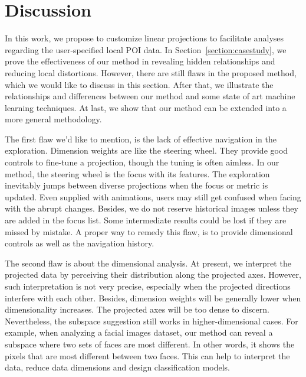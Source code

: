 \section{Discussion}
\label{section:discussion}
In this work, we propose to customize linear projections to facilitate analyses regarding the user-specified local POI data. In Section~\ref{section:casestudy}, we prove the effectiveness of our method in revealing hidden relationships and reducing local distortions. However, there are still flaws in the proposed method, which we would like to discuss in this section. After that, we illustrate the relationships and differences between our method and some state of art machine learning techniques. At last, we show that our method can be extended into a more general methodology.

The first flaw we'd like to mention, is the lack of effective navigation in the exploration. Dimension weights are like the steering wheel. They provide good controls to fine-tune a projection, though the tuning is often aimless. In our method, the steering wheel is the focus with its features. The exploration inevitably jumps between diverse projections when the focus or metric is updated. Even supplied with animations, users may still get confused when facing with the abrupt changes. Besides, we do not reserve historical images unless they are added in the focus list. Some intermediate results could be lost if they are missed by mistake. A proper way to remedy this flaw, is to provide dimensional controls as well as the navigation history.

The second flaw is about the dimensional analysis. At present, we interpret the projected data by perceiving their distribution along the projected axes. However, such interpretation is not very precise, especially when the projected directions interfere with each other. Besides, dimension weights will be generally lower when dimensionality increases. The projected axes will be too dense to discern. Nevertheless, the subspace suggestion still works in higher-dimensional cases. For example, when analyzing a facial images dataset, our method can reveal a subspace where two sets of faces are most different. In other words, it shows the pixels that are most different between two faces. This can help to interpret the data, reduce data dimensions and design classification models.

